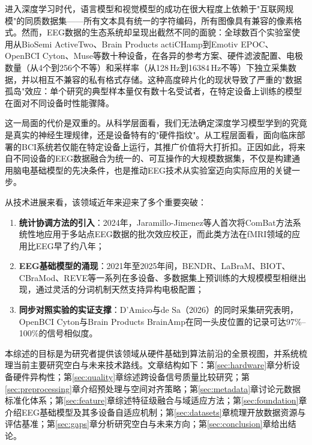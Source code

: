 \documentclass[12pt, a4paper]{article}
\begin{document}
进入深度学习时代，语言模型和视觉模型的成功在很大程度上依赖于"互联网规模"的同质数据集——所有文本具有统一的字符编码，所有图像具有兼容的像素格式。然而，EEG数据的生态系统却呈现出截然不同的面貌：全球数百个实验室使用从BioSemi ActiveTwo、Brain Products actiCHamp到Emotiv EPOC、OpenBCI Cyton、Muse等数十种设备，在各异的参考方案、硬件滤波配置、电极数量（从4个到256个不等）和采样率（从128\,Hz到16384\,Hz不等）下独立采集数据，并以相互不兼容的私有格式存储。这种高度碎片化的现状导致了严重的"数据孤岛"效应：单个研究的典型样本量仅有数十名受试者，在特定设备上训练的模型在面对不同设备时性能骤降\citep{EEGFMreview2025}。

这一局面的代价是双重的。从科学层面看，我们无法确定深度学习模型学到的究竟是真实的神经生理规律，还是设备特有的"硬件指纹"。从工程层面看，面向临床部署的BCI系统若仅能在特定设备上运行，其推广价值将大打折扣。正因如此，将来自不同设备的EEG数据融合为统一的、可互操作的大规模数据集，不仅是构建通用脑电基础模型的先决条件，也是推动EEG技术从实验室迈向实际应用的关键一步。

从技术进展来看，该领域近年来迎来了多个重要突破：

\begin{enumerate}[leftmargin=2em]
  \item \textbf{统计协调方法的引入}：2024年，Jaramillo-Jimenez等人首次将ComBat方法系统性地应用于多站点EEG数据的批次效应校正\citep{Jaramillo2024ComBat}，而此类方法在fMRI领域的应用比EEG早了约八年\citep{Fortin2017DTI}；
  \item \textbf{EEG基础模型的涌现}：2021年至2025年间，BENDR\citep{Kostas2021BENDR}、LaBraM\citep{Jiang2024LaBraM}、BIOT\citep{Yang2023BIOT}、CBraMod\citep{Wang2025CBraMod}、REVE\citep{ElOuahidi2025REVE}等一系列在多设备、多数据集上预训练的大规模模型相继出现，通过灵活的分词机制天然支持异构电极配置；
  \item \textbf{同步对照实验的实证支撑}：D'Amico与de Sa（2026）的同时采集研究表明，OpenBCI Cyton与Brain Products BrainAmp在同一头皮位置的记录可达97\%--100\%的信号相似度\citep{DAmico2026}。
\end{enumerate}

本综述的目标是为研究者提供该领域从硬件基础到算法前沿的全景视图，并系统梳理当前主要研究空白与未来技术路线。文章结构如下：第\ref{sec:hardware}章分析设备硬件异构性；第\ref{sec:quality}章综述跨设备信号质量比较研究；第\ref{sec:preprocessing}章介绍预处理与空间对齐策略；第\ref{sec:metadata}章讨论元数据标准化体系；第\ref{sec:feature}章综述特征级融合与域适应方法；第\ref{sec:foundation}章介绍EEG基础模型及其多设备自适应机制；第\ref{sec:datasets}章梳理开放数据资源与评估基准；第\ref{sec:gaps}章分析研究空白与未来方向；第\ref{sec:conclusion}章给出结论。
\end{document}
